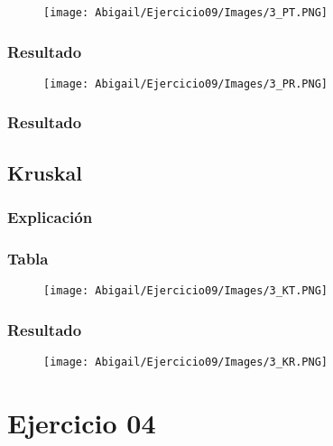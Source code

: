 \documentclass[12pt]{article}
\begin{document}
        \begin{figure}[h!]
          \centering
          \texttt{[image: Abigail/Ejercicio09/Images/3\_PT.PNG]}
        \end{figure} 

      \subsubsection{Resultado}
        \begin{figure}[h!]
          \centering
          \texttt{[image: Abigail/Ejercicio09/Images/3\_PR.PNG]}
        \end{figure} 

      \subsubsection{Resultado}

    \subsection{Kruskal}

      \subsubsection{Explicación}

      \subsubsection{Tabla}
        \begin{figure}[h!]
          \centering
          \texttt{[image: Abigail/Ejercicio09/Images/3\_KT.PNG]}
        \end{figure} 

      \subsubsection{Resultado}

        \begin{figure}[h!]
          \centering
          \texttt{[image: Abigail/Ejercicio09/Images/3\_KR.PNG]}
        \end{figure} 

  
  \section{Ejercicio 04}
\end{document}
